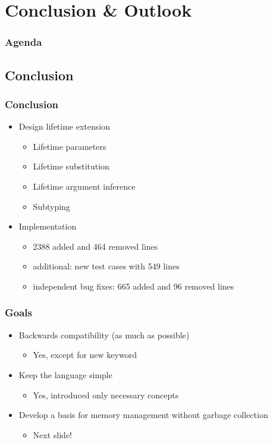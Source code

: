 \section{Conclusion \& Outlook}

\begin{frame}
	\frametitle{Agenda}
\end{frame}

\subsection{Conclusion}
\begin{frame}
	\frametitle{Conclusion}
	\begin{itemize}[<+->]
		\item Design lifetime extension
		\begin{itemize}
			\item Lifetime parameters
			\item Lifetime substitution
			\item Lifetime argument inference
			\item Subtyping
		\end{itemize}
		\item Implementation
		\begin{itemize}
			\item 2388 added and 464 removed lines
			\item additional: new test cases with 549 lines
			\item independent bug fixes: 665 added and 96 removed lines
		\end{itemize}
	\end{itemize}
\end{frame}

\begin{frame}
	\frametitle{Goals}
	\begin{itemize}[<+->]
		\item Backwards compatibility (as much as possible)
		\begin{itemize}
			\item[\checkmark] Yes, except for new keyword 
		\end{itemize}
		\item Keep the language simple
		\begin{itemize}
			\item[\checkmark] Yes, introduced only necessary concepts
		\end{itemize}
		\item Develop a basis for memory management without garbage collection
		\begin{itemize}
			\item[\checkmark] Next slide!
		\end{itemize}
	\end{itemize}
\end{frame}

